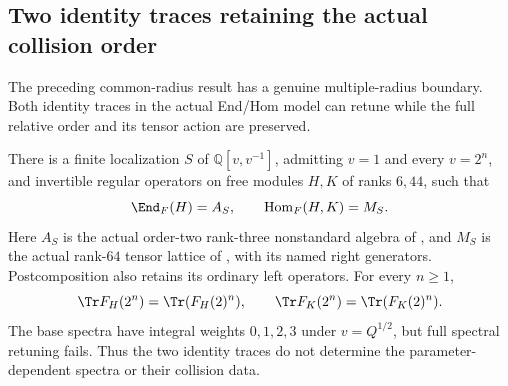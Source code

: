 \subsection{Two identity traces retaining the actual collision order}
The preceding common-radius result has a genuine multiple-radius
boundary. Both identity traces in the actual End/Hom model can
retune while the full relative order and its tensor action are
preserved.

\begin{finding}
\label{f:traceonlyactualmodel}
There is a finite localization $S$ of $\mathbb Q[v,v^{-1}]$,
admitting $v=1$ and every $v=2^n$, and invertible regular
operators on free modules $H,K$ of ranks $6,44$, such that
\[
 \End_F(H)=A_S,\qquad \operatorname{Hom}_F(H,K)=M_S.
\]
Here $A_S$ is the actual order-two rank-three nonstandard
algebra of , and $M_S$ is the actual rank-$64$
tensor lattice of , with its named right generators.
Postcomposition also retains its ordinary left operators.
For every $n\ge1$,
\begin{equation}\label{eq:twogenuinetraces}
 \Tr F_H(2^n)=\Tr(F_H(2)^n),\qquad
 \Tr F_K(2^n)=\Tr(F_K(2)^n).
\end{equation}
The base spectra have integral weights $0,1,2,3$ under
$v=Q^{1/2}$, but full spectral retuning fails.
Thus the two identity traces do not determine the
parameter-dependent spectra or their collision data.
\end{finding}

